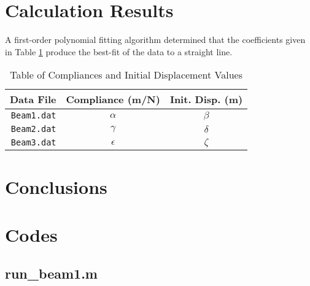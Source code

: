 \documentclass{article}
\begin{document}
\section{Calculation Results}
A first-order polynomial fitting algorithm determined that 
the coefficients given in Table \ref{Coefs} 
produce the best-fit of the data to a straight line.
\begin{table}[h]
\begin{center}
\begin{tabular}{r|c|c}
Data File & Compliance (m/N) & Init. Disp. (m)\\ \hline \hline
\texttt{Beam1.dat} & $\alpha$ & $\beta$ \\ \hline
\texttt{Beam2.dat} & $\gamma$ & $\delta$ \\ \hline
\texttt{Beam3.dat} & $\epsilon$ & $\zeta$ \\ \hline
\end{tabular}
\caption{Table of Compliances and Initial Displacement Values \label{Coefs}}
\end{center}
\end{table}


\section{Conclusions}
\pagebreak

\appendix
\section{Codes}


\lstset{style=python103, language=python} 
\subsection{run\_beam1.m}

\pagebreak %
\end{document}
